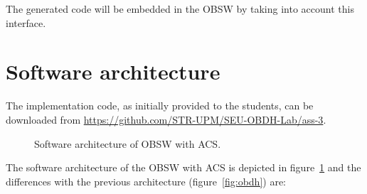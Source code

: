 The generated code will be embedded in the OBSW by taking into account this interface.

\section{Software architecture}

The implementation code, as initially provided to the students, can be downloaded from \url{https://github.com/STR-UPM/SEU-OBDH-Lab/ass-3}.

\begin{figure}[H]
            \caption{Software architecture of OBSW with ACS.}
            \label{fig:obdh-acs}
\end{figure}

The software architecture of the OBSW with ACS is depicted in figure~\ref{fig:obdh-acs} and the differences with the previous architecture (figure~\ref{fig:obdh}) are:

